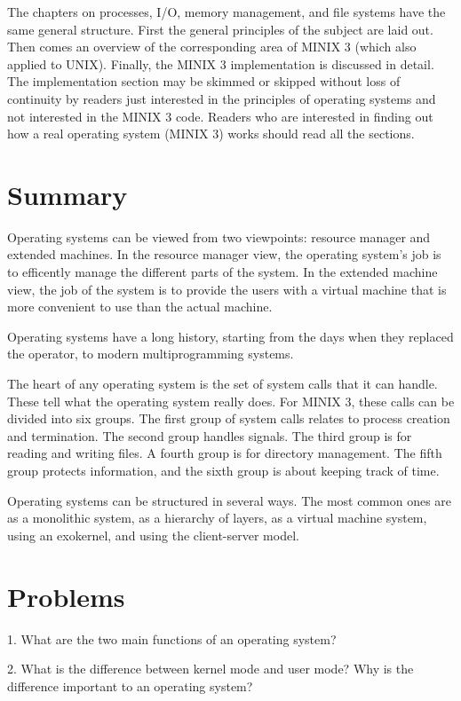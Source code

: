 \documentclass{book}
\begin{document}
The chapters on processes, I/O, memory management, and file systems have the same general structure.
First the general principles of the subject are laid out.
Then comes an overview of the corresponding area of MINIX 3 (which also applied to UNIX).
Finally, the MINIX 3 implementation is discussed in detail.
The implementation section may be skimmed or skipped without loss of continuity by readers 
just interested in the principles of operating systems and not interested in the MINIX 3 code.
Readers who are interested in finding out how a real operating system (MINIX 3) works should read all the sections.

\section{Summary}
Operating systems can be viewed from two viewpoints: resource manager and extended machines.
In the resource manager view, the operating system's job is to efficently manage the different parts of the system.
In the extended machine view, the job of the system is to provide the users with a virtual machine 
that is more convenient to use than the actual machine.
 
Operating systems have a long history, starting from the days when they replaced the operator,
to modern multiprogramming systems.

The heart of any operating system is the set of system calls that it can handle.
These tell what the operating system really does.
For MINIX 3, these calls can be divided into six groups.
The first group of system calls relates to process creation and termination.
The second group handles signals.
The third group is for reading and writing files.
A fourth group is for directory management.
The fifth group protects information, and the sixth group is about keeping track of time.

Operating systems can be structured in several ways.
The most common ones are as a monolithic system, as a hierarchy of layers, as a virtual machine system,
using an exokernel, and using the client-server model.

\section{Problems}
1. What are the two main functions of an operating system?

2. What is the difference between kernel mode and user mode? Why is the difference important to an operating system?
\end{document}

